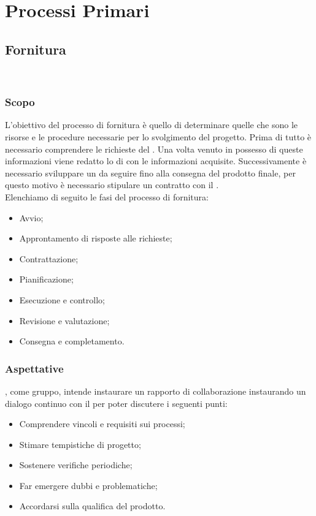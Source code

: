 \section{Processi Primari}
\subsection{Fornitura}\
\subsubsection{Scopo}
L'obiettivo del processo di fornitura è quello di determinare quelle che sono le risorse e le procedure necessarie per lo svolgimento del progetto. 
Prima di tutto è necessario comprendere le richieste del \proponProg. Una volta venuto in possesso di queste informazioni viene redatto lo  di \SdFv con le informazioni acquisite.
Successivamente è necessario sviluppare un \PdPv da seguire fino alla consegna del prodotto finale, per questo motivo è necessario stipulare un contratto con il \proponProg.\\
Elenchiamo di seguito le fasi del processo di fornitura:
\begin{itemize}
    \item{Avvio;}
    \item{Approntamento di risposte alle richieste;}
    \item{Contrattazione;}
    \item{Pianificazione;}
    \item{Esecuzione e controllo;}
    \item{Revisione e valutazione;}
    \item{Consegna e completamento.}
\end{itemize}

\subsubsection{Aspettative}
\Omicron, come gruppo, intende instaurare un rapporto di collaborazione instaurando un dialogo continuo con il \proponProg per poter discutere i seguenti punti:\\
\begin{itemize}
    \item{Comprendere vincoli e requisiti sui processi;}
    \item{Stimare tempistiche di progetto;}
    \item{Sostenere verifiche periodiche;}
    \item{Far emergere dubbi e problematiche;}
    \item{Accordarsi sulla qualifica del prodotto.}
\end{itemize}


